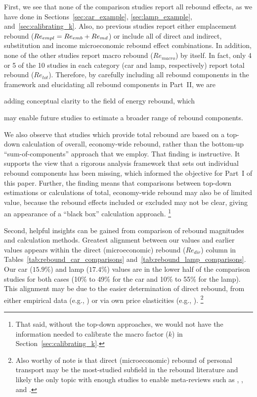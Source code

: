\documentclass[12pt]{article}\usepackage[]{graphicx}\usepackage[]{xcolor}
\begin{document}
First, we see that none of the comparison studies
report all rebound effects, as we have done
in Sections~\ref{sec:car_example}, \ref{sec:lamp_example}, and~\ref{sec:calibrating_k}. 
Also, no previous studies report either emplacement rebound 
($Re_{empl} = Re_{emb} + Re_{md}$)
or include all of direct and indirect, substitution and
income microeconomic rebound effect combinations.
In addition, none of the other studies report macro rebound ($Re_{macro}$) by itself.
In fact, only 4 or 5 of the 10 studies
in each category (car and lamp, respectively) report total rebound ($Re_{tot}$).
Therefore, by carefully including all rebound components 
in the framework and 
elucidating all rebound components in Part~II, we are 
%
\begin{enumerate*}[label={(\roman*)}]
	
  \item adding conceptual clarity to the field of energy rebound, which
  
  \item may enable future studies to estimate a broader range of rebound components.
    
\end{enumerate*}

We also observe that studies which provide total rebound 
are based on a top-down calculation of overall, economy-wide rebound, 
rather than the bottom-up ``sum-of-components'' approach 
that we employ.
That finding is instructive. 
It supports the view that
a rigorous analysis framework that sets out individual rebound components
has been missing, which
informed the objective for Part~I of this paper.
Further, the finding means that 
comparisons between top-down estimations or calculations 
of total, economy-wide rebound 
may also be of limited value,
because the rebound effects included or excluded may not be clear, 
giving an appearance of a ``black box'' calculation approach.%
\footnote{
  That said, without the top-down approaches,
  we would not have the information needed to calibrate 
  the macro factor ($k$) in Section~\ref{sec:calibrating_k}.
}

Second, helpful insights can be gained
from comparison of rebound magnitudes and calculation methods.
Greatest alignment between our values and earlier values
appears within the direct (microeconomic) rebound ($Re_{dir}$) column
in Tables~\ref{tab:rebound_car_comparisons} and~\ref{tab:rebound_lamp_comparisons}.
Our car ($15.9$\%) and lamp ($17.4$\%) values
are in the lower half of the comparison studies
for both cases (10\% to 49\% for the car and 10\% to 55\% for the lamp).
This alignment may be due to the easier determination
of direct rebound, from either empirical data
(e.g., \citet{Small:2007aa}) or
via own price elasticities (e.g., \citet{Chitnis:2015}).%
\footnote{
  Also worthy of note is that direct (microeconomic) rebound 
  of personal transport may be the most-studied subfield 
  in the rebound literature and likely the only topic with enough studies
  to enable meta-reviews such as 
  \citet{Sorrell:2009aa}, 
  \citet{Dimitropoulos:2018aa}, and 
  \citet{Gillingham:2020aa}.
}
\end{document}
